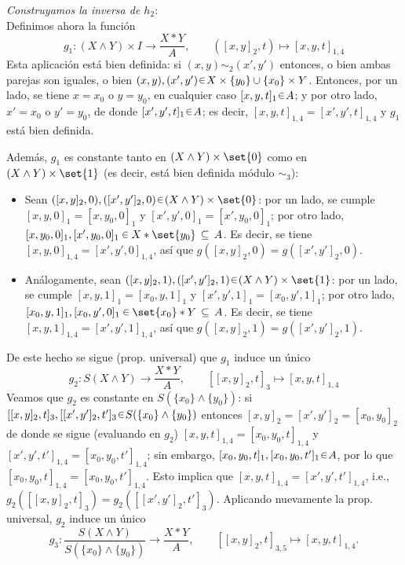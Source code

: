 \begin{sol}[Demostración]
\vspace{1em}\emph{Construyamos la inversa de $h_2$}:\\
Definimos ahora la función 
\[
g_1\colon (X\wedge Y)\times I \longrightarrow \frac{X*Y}{A} ,
\qquad
([x,y]_2,t)\longmapsto [x,y,t]_{1,4} 
\]
Esta aplicación está bien definida: si $(x,y)\sim_2(x',y')$ entonces, o bien ambas parejas son iguales, o bien
$(x,y),(x',y') \en X\times\{y_0\} \cup \{x_0\}\times Y$. Entonces, por un lado, se tiene $x = x_0$ o $y=y_0$, en cualquier caso $[x,y,t]_1 \en A$; y por otro lado, $x'=x_0$ o $y'=y_0$, de donde $[x',y',t]_1 \en A$; es decir, $[x,y,t]_{1,4} = [x',y',t]_{1,4}$ y $g_1$ está bien definida.

Además, $g_1$ es constante tanto en $(X \wedge Y) \times\set{0}$ como en $(X \wedge Y) \times\set{1}$ (es decir, está bien definida módulo $\sim_3$):
\begin{itemize}[leftmargin=1.2em]
\item Sean $([x,y]_2,0),([x',y']_2,0) \en (X \wedge Y) \times\set{0}$: por un lado, se cumple $[x,y,0]_1 = [x,y_0,0]_1$ y $[x',y',0]_1 = [x',y_0,0]_1$; por otro lado, $[x,y_0,0]_1,[x',y_0,0]_1 \,\en\, X * \set{y_0} \,\subseteq\, A$. Es decir, se tiene $[x,y,0]_{1,4} = [x',y',0]_{1,4}$, así que $g([x,y]_2,0) = g([x',y']_2,0)$.

\item Análogamente, sean $([x,y]_2,1),([x',y']_2,1) \en (X \wedge Y) \times\set{1}$: por un lado, se cumple $[x,y,1]_1 = [x_0,y,1]_1$ y $[x',y',1]_1 = [x_0,y',1]_1$; por otro lado, $[x_0,y,1]_1,[x_0,y',0]_1 \,\en\, \set{x_0} * Y \,\subseteq\, A$. Es decir, se tiene $[x,y,1]_{1,4} = [x',y',1]_{1,4}$, así que $g([x,y]_2,1) = g([x',y']_2,1)$.
\end{itemize}
De este hecho se sigue (prop. universal) que $g_1$ induce un único
\[
g_2\colon S(X\wedge Y) \longrightarrow \frac{X*Y}{A} ,
\qquad
[[x,y]_2,t]_3\longmapsto [x,y,t]_{1,4}
\]
Veamos que $g_2$ es constante en $S(\{x_0\}\wedge\{y_0\})$:
si $[[x,y]_2,t]_3,[[x',y']_2,t']_3 \en S(\{x_0\}\wedge\{y_0\})$ entonces $[x,y]_2=[x',y']_2 = [x_0,y_0]_2$
de donde se sigue (evaluando en $g_2$) $[x,y,t]_{1,4} = [x_0,y_0,t]_{1,4}$ y $[x',y',t']_{1,4} = [x_0,y_0,t']_{1,4}$; sin embargo, $[x_0,y_0,t]_1, [x_0,y_0,t']_1 \en A$, por lo que $[x_0,y_0,t]_{1,4} = [x_0,y_0,t']_{1,4}$. Esto implica que $[x,y,t]_{1,4} = [x',y',t']_{1,4}$, i.e., $g_2([[x,y]_2,t]_3) = g_2([[x',y']_2,t']_3)$. Aplicando nuevamente la prop. universal, $g_2$ induce un único
\[
g_3
\colon 
\frac{S(X\wedge Y)}{S(\{x_0\}\wedge\{y_0\})}
\longrightarrow
\frac{X*Y}{A},
\qquad
[[x,y]_2,t]_{3,5}\longmapsto [x,y,t]_{1,4}.
\]


\end{sol}

